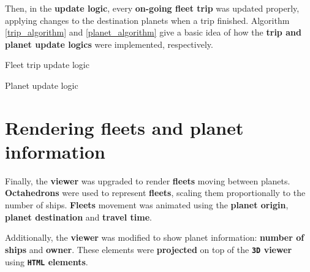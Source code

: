 \documentclass[a4paper,11pt,titlepage,abstract,numbers=noenddot,automark,mnsy,intlimits,rgb,dvipsnames]{report}
\begin{document}
Then, in the \textbf{update logic}, every \textbf{on-going fleet trip} was updated properly, applying changes to the destination planets
when a trip finished. Algorithm \autoref{trip_algorithm} and \autoref{planet_algorithm} give a basic idea of how the \textbf{trip and planet
update logics} were implemented, respectively.
\begin{algorithm}[H]
\caption{Fleet trip update logic}
\label{trip_algorithm}
\begin{algorithmic}
\ENDIF
\ENDFOR
\end{algorithmic}
\end{algorithm}
\begin{algorithm}[H]
\caption{Planet update logic}
\label{planet_algorithm}
\begin{algorithmic}
\ENDIF
{}
\ELSE
{}
\ELSE
{}
\ENDIF
\ENDIF
\end{algorithmic}
\end{algorithm}
\section{Rendering fleets and planet information}
Finally, the \textbf{viewer} was upgraded to render \textbf{fleets} moving between planets. \textbf{Octahedrons} were used to represent
\textbf{fleets}, scaling them proportionally to the number of ships. \textbf{Fleets} movement was animated using the \textbf{planet origin},
\textbf{planet destination} and \textbf{travel time}.

Additionally, the \textbf{viewer} was modified to show planet information: \textbf{number of ships} and \textbf{owner}. These elements were
\textbf{projected} on top of the \textbf{\texttt{3D} viewer} using \textbf{\texttt{HTML} elements}.
\end{document}
